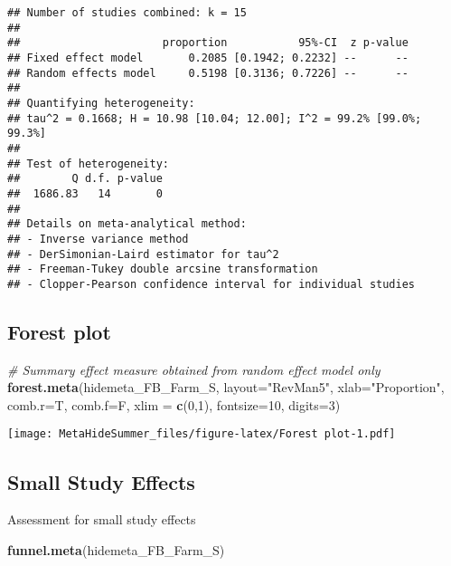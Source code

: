 \documentclass[]{article}
\newenvironment{Shaded}{\begin{snugshade}}{\end{snugshade}}
\newcommand{\KeywordTok}[1]{\textcolor[rgb]{0.13,0.29,0.53}{\textbf{#1}}}
\newcommand{\DataTypeTok}[1]{\textcolor[rgb]{0.13,0.29,0.53}{#1}}
\newcommand{\DecValTok}[1]{\textcolor[rgb]{0.00,0.00,0.81}{#1}}
\newcommand{\StringTok}[1]{\textcolor[rgb]{0.31,0.60,0.02}{#1}}
\newcommand{\CommentTok}[1]{\textcolor[rgb]{0.56,0.35,0.01}{\textit{#1}}}
\newcommand{\NormalTok}[1]{#1}
\begin{document}
\begin{verbatim}
## Number of studies combined: k = 15
## 
##                      proportion           95%-CI  z p-value
## Fixed effect model       0.2085 [0.1942; 0.2232] --      --
## Random effects model     0.5198 [0.3136; 0.7226] --      --
## 
## Quantifying heterogeneity:
## tau^2 = 0.1668; H = 10.98 [10.04; 12.00]; I^2 = 99.2% [99.0%; 99.3%]
## 
## Test of heterogeneity:
##        Q d.f. p-value
##  1686.83   14       0
## 
## Details on meta-analytical method:
## - Inverse variance method
## - DerSimonian-Laird estimator for tau^2
## - Freeman-Tukey double arcsine transformation
## - Clopper-Pearson confidence interval for individual studies
\end{verbatim}

\subsection{Forest plot}\label{forest-plot}

\begin{Shaded}
\begin{Highlighting}[]
\CommentTok{# Summary effect measure obtained from random effect model only}
\KeywordTok{forest.meta}\NormalTok{(hidemeta_FB_Farm_S, }\DataTypeTok{layout=}\StringTok{"RevMan5"}\NormalTok{, }\DataTypeTok{xlab=}\StringTok{"Proportion"}\NormalTok{, }\DataTypeTok{comb.r=}\NormalTok{T, }\DataTypeTok{comb.f=}\NormalTok{F, }\DataTypeTok{xlim =} \KeywordTok{c}\NormalTok{(}\DecValTok{0}\NormalTok{,}\DecValTok{1}\NormalTok{), }\DataTypeTok{fontsize=}\DecValTok{10}\NormalTok{, }\DataTypeTok{digits=}\DecValTok{3}\NormalTok{)}
\end{Highlighting}
\end{Shaded}

\texttt{[image: MetaHideSummer\_files/figure-latex/Forest plot-1.pdf]}

\subsection{Small Study Effects}\label{small-study-effects}

Assessment for small study effects

\begin{Shaded}
\begin{Highlighting}[]
\KeywordTok{funnel.meta}\NormalTok{(hidemeta_FB_Farm_S)}
\end{Highlighting}
\end{Shaded}
\end{document}
